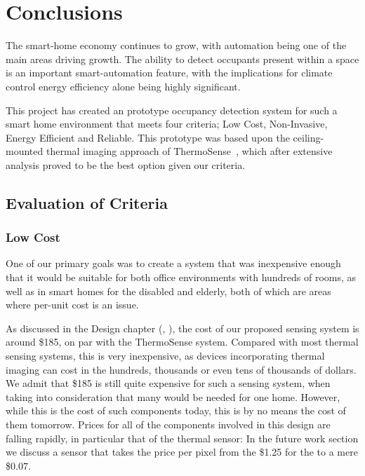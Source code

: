 \documentclass[../thesis/thesis.tex]{subfiles}
\begin{document}
 \chapter{Conclusions}

The smart-home economy continues to grow, with automation being one of the main areas driving growth. The ability to detect occupants present within a space is an important smart-automation feature, with the implications for climate control energy efficiency alone being highly significant.

This project has created an prototype occupancy detection system for such a smart home environment that meets four criteria; Low Cost, Non-Invasive, Energy Efficient and Reliable. This prototype was based upon the ceiling-mounted thermal imaging approach of ThermoSense~\cite{beltran2013thermosense}, which after extensive analysis proved to be the best option given our criteria.

\section{Evaluation of Criteria}

\subsection{Low Cost}
One of our primary goals was to create a system that was inexpensive enough that it would be suitable for both office environments with hundreds of rooms, as well as in smart homes for the disabled and elderly, both of which are areas where per-unit cost is an issue.

As discussed in the Design chapter (, ), the cost of our proposed sensing system is around \$185, on par with the ThermoSense system. Compared with most thermal sensing systems, this is very inexpensive, as devices incorporating thermal imaging can cost in the hundreds, thousands or even tens of thousands of dollars. We admit that \$185 is still quite expensive for such a sensing system, when taking into consideration that many would be needed for one home. However, while this is the cost of such components today, this is by no means the cost of them tomorrow. Prices for all of the components involved in this design are falling rapidly, in particular that of the thermal sensor: In the future work section we discuss a sensor that takes the price per pixel from the \$1.25 for the \mlx to a mere \$0.07.
\end{document}
